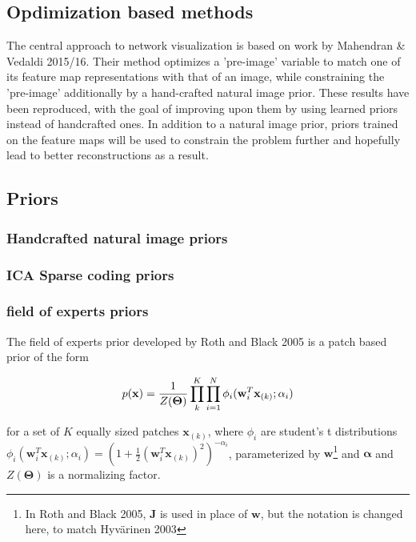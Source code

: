 \documentclass{article}
\begin{document}
\subsection{Opdimization based methods}

The central approach to network visualization is based on work by Mahendran \& Vedaldi 2015/16. Their method optimizes a 'pre-image' variable to match one of its feature map representations with that of an image, while constraining the 'pre-image' additionally by a hand-crafted natural image prior. These results have been reproduced, with the goal of improving upon them by using learned priors instead of handcrafted ones. In addition to a natural image prior, priors trained on the feature maps will be used to constrain the problem further and hopefully lead to better reconstructions as a result.
	
\subsection{Priors}


\subsubsection{Handcrafted natural image priors}


\subsubsection{ICA Sparse coding priors}



\subsubsection{field of experts priors}

The field of experts prior developed by Roth and Black 2005 is a patch based prior of the form 

\begin{equation}
	p(\mathbf{x}) = \frac{1}{Z(\bm{\Theta})} \prod_{k}^K \prod_{i=1}^{N} \phi_i (\mathbf{w}_i^T \mathbf{x}_{(k)} ; \alpha_i) \\
\end{equation}

for a set of $K$ equally sized patches $\mathbf{x}_{(k)}$, where $\phi_i$ are student's t distributions $\phi_i(\mathbf{w}_i^T \mathbf{x}_{(k)} ; \alpha_i) = (1 + \frac{1}{2}(\mathbf{w}_i^T \mathbf{x}_{(k)})^2 )^{-\alpha_i}$, parameterized by $\mathbf{w}$\footnote{In Roth and Black 2005, $\mathbf{J}$ is used in place of $\mathbf{w}$, but the notation is changed here, to match Hyvärinen 2003} and $\mathbf{\alpha}$ and $Z(\bm{\Theta})$ is a normalizing factor. 
\end{document}
